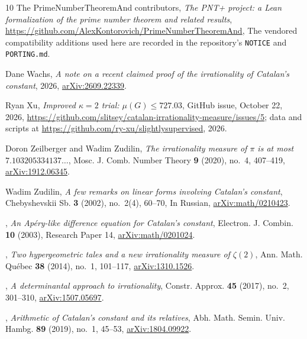 \documentclass[11pt]{amsart}
\theoremstyle{definition}
\theoremstyle{remark}
\numberwithin{equation}{section}
\begin{document}
\begin{thebibliography}{10}
{The PrimeNumberTheoremAnd contributors}, \emph{The {PNT+} project: a {L}ean
  formalization of the prime number theorem and related results},
  \url{https://github.com/AlexKontorovich/PrimeNumberTheoremAnd}, The vendored
  compatibility additions used here are recorded in the repository's
  \texttt{NOTICE} and \texttt{PORTING.md}.

Dane Wachs, \emph{A note on a recent claimed proof of the irrationality of
  {C}atalan's constant}, 2026,
  \href{https://arxiv.org/abs/2609.22339}{arXiv:2609.22339}.

Ryan Xu, \emph{Improved {$\kappa=2$} trial: {$\mu(G)\le727.03$}}, GitHub issue,
  October 22, 2026,
  \url{https://github.com/slitsey/catalan-irrationality-measure/issues/5}; data
  and scripts at \url{https://github.com/ry-xu/slightlysupervised}, 2026.

Doron Zeilberger and Wadim Zudilin, \emph{The irrationality measure of {$\pi$}
  is at most {$7.103205334137\ldots$}}, Mosc. J. Comb. Number Theory \textbf{9}
  (2020), no.~4, 407--419,
  \href{https://arxiv.org/abs/1912.06345}{arXiv:1912.06345}.

Wadim Zudilin, \emph{A few remarks on linear forms involving {C}atalan's
  constant}, Chebyshevskii Sb. \textbf{3} (2002), no.~2(4), 60--70, In Russian,
  \href{https://arxiv.org/abs/math/0210423}{arXiv:math/0210423}.

\bysame, \emph{An {A}p\'ery-like difference equation for {C}atalan's constant},
  Electron. J. Combin. \textbf{10} (2003), Research Paper 14,
  \href{https://arxiv.org/abs/math/0201024}{arXiv:math/0201024}.

\bysame, \emph{Two hypergeometric tales and a new irrationality measure of
  {$\zeta(2)$}}, Ann. Math. Qu\'ebec \textbf{38} (2014), no.~1, 101--117,
  \href{https://arxiv.org/abs/1310.1526}{arXiv:1310.1526}.

\bysame, \emph{A determinantal approach to irrationality}, Constr. Approx.
  \textbf{45} (2017), no.~2, 301--310,
  \href{https://arxiv.org/abs/1507.05697}{arXiv:1507.05697}.

\bysame, \emph{Arithmetic of {C}atalan's constant and its relatives}, Abh.
  Math. Semin. Univ. Hambg. \textbf{89} (2019), no.~1, 45--53,
  \href{https://arxiv.org/abs/1804.09922}{arXiv:1804.09922}.

\end{thebibliography}
\end{document}
